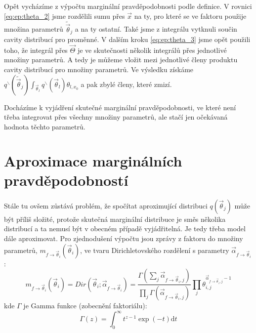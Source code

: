 Opět vycházíme z výpočtu marginální pravděpodobnosti podle definice.
V rovnici \eqref{eq:ep:theta_2} jsme rozdělili sumu přes
$\vec{x}$ na ty, pro které se ve faktoru použije množina parametrů
$\tilde{\vec{\theta}}_j$ a na ty ostatní. Také jsme z integrálu vytknuli součin
cavity distribucí pro proměnné. V dalším kroku \eqref{eq:ep:theta_3} jsme opět
použili toho, že integrál přes $\vec{\Theta}$ je ve skutečnosti několik
integrálů přes jednotlivé množiny parametrů. A tedy je můžeme vložit mezi
jednotlivé členy produktu cavity distribucí pro množiny parametrů. Ve výsledku
získáme $q^\backslash(\tilde{\vec{\theta}}_j) \int_{\vec{\theta}_l}
q^\backslash(\vec{\theta}_l) \theta_{l, x_0}$ a pak zbylé členy, které zmizí.

Docházíme k vyjádření skutečné marginální pravděpodobnosti, ve které není třeba
integrovat přes všechny množiny parametrů, ale stačí jen očekávaná hodnota
těchto parametrů.

\section{Aproximace marginálních pravděpodobností}

Stále tu ovšem zůstává problém, že spočítat aproximující distribuci
$q(\vec{\theta}_j)$ může být příliš složité, protože skutečná marginální
distribuce je směs několika distribucí a ta nemusí být v obecném případě
vyjádřitelná. Je tedy třeba model dále aproximovat. Pro zjednodušení výpočtu
jsou zprávy z faktoru do množiny parametrů, $m_{f \rightarrow
\vec{\theta}_i}(\vec{\theta}_i)$, ve tvaru Dirichletovského rozdělení s
parametry $\vec\alpha_{f \rightarrow \vec\theta_i}$:
\begin{equation}
m_{f \rightarrow \vec{\theta}_i}(\vec{\theta}_i) =
	Dir(\vec{\theta}_i; \vec\alpha_{f \rightarrow \vec\theta_i}) =
        \frac{\Gamma (\sum_j \vec\alpha_{f \rightarrow \vec\theta_i, j})}
             {\prod_j \Gamma(\vec\alpha_{f \rightarrow \vec\theta_i, j})}
        \prod_j \theta_{i,j}^{\vec\alpha_{f \rightarrow \vec\theta_i, j} - 1}
\end{equation}
kde $\Gamma$ je Gamma funkce (zobecnění faktoriálu):
\begin{equation}
    \Gamma(z) = \int_0^\infty \! t^{z-1} \exp(-t) \mathrm{d}t
\end{equation}

